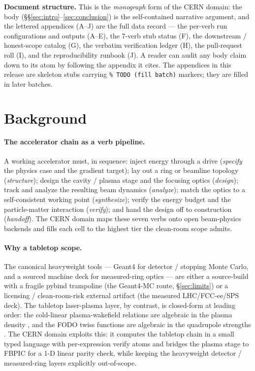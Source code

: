 \documentclass[11pt,a4paper]{article}
\begin{document}
\smallskip\noindent\textbf{Document structure.} This is the
\emph{monograph} form of the CERN domain: the body
(\S\S\ref{sec:intro}--\ref{sec:conclusion}) is the self-contained
narrative argument, and the lettered appendices (A--J) are the full data
record --- the per-verb run configurations and outputs (A--E), the
7-verb stub status (F), the downstream / honest-scope catalog (G), the
verbatim verification ledger (H), the pull-request roll (I), and the
reproducibility runbook (J). A reader can audit any body claim down to
its atom by following the appendix it cites. The appendices in this
release are skeleton stubs carrying \texttt{\% TODO (fill batch)}
markers; they are filled in later batches.

\section{Background}
\label{sec:bg}

\paragraph{The accelerator chain as a verb pipeline.} A working
accelerator must, in sequence: inject energy through a drive
(\emph{specify} the physics case and the gradient target); lay out a ring
or beamline topology (\emph{structure}); design the cavity / plasma stage
and the focusing optics (\emph{design}); track and analyze the resulting
beam dynamics (\emph{analyze}); match the optics to a self-consistent
working point (\emph{synthesize}); verify the energy budget and the
particle-matter interaction (\emph{verify}); and hand the design off to
construction (\emph{handoff}). The CERN domain maps these seven verbs
onto open beam-physics backends and fills each cell to the highest tier
the clean-room scope admits.

\paragraph{Why a tabletop scope.} The canonical heavyweight tools ---
Geant4 \citep{agostinelli2003geant4} for detector / stopping Monte
Carlo, and a sourced machine deck for measured-ring optics --- are either
a source-build with a fragile pybind trampoline (the Geant4-MC route,
\S\ref{sec:limits}) or a licensing / clean-room-risk external artifact
(the measured LHC/FCC-ee/SPS deck). The tabletop laser-plasma layer, by
contrast, is closed-form at leading order: the cold-linear
plasma-wakefield relations are algebraic in the plasma density
\citep{dawson1959,esarey2009lpa}, and the FODO twiss functions are
algebraic in the quadrupole strengths \citep{wiedemann2015,lee2004}. The
CERN domain exploits this: it computes the tabletop chain in a small
typed language with per-expression verify atoms and bridges the plasma
stage to FBPIC \citep{lehe2016fbpic} for a 1-D linear parity check, while
keeping the heavyweight detector / measured-ring layers explicitly
out-of-scope.
\end{document}
